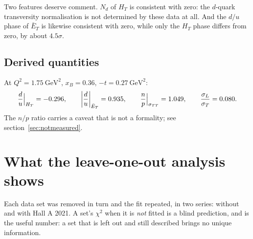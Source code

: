 \documentclass[11pt,a4paper]{article}
\newcommand{\sig}[1]{\sigma_{#1}}
\begin{document}
\begin{table}[htb]
\centering\small
\caption{Block parameters, eq.~(\ref{eq:gff}).  $N$ in nb$^{1/2}$/GeV,
$b$ and $b'$ in GeV$^{-2}$, $n_Q$ dimensionless.}
\label{tab:blocks}

\end{table}

\begin{table}[htb]
\centering\small
\caption{Remaining parameters, with the interval each was allowed.}
\label{tab:other}

\end{table}

Two features deserve comment.  $N_d$ of $H_T$ is consistent with zero: the
$d$-quark transversity normalisation is not determined by these data at all.
And the $d/u$ phase of $\bar E_T$ is likewise consistent with zero, while only
the $H_T$ phase differs from zero, by about $4.5\sigma$.

\subsection{Derived quantities}

At $Q^2 = 1.75\ \mathrm{GeV}^2$, $x_B = 0.36$, $-t = 0.27\ \mathrm{GeV}^2$:
\[
\frac{d}{u}\Big|_{H_T} = \rduHT, \qquad
\left|\frac{d}{u}\right|_{\bar E_T} = \rduET, \qquad
\frac{n}{p}\Big|_{\sig{TT}} = \rnoverp, \qquad
\frac{\sig{L}}{\sig{T}} = \rsigLoversigT .
\]
The $n/p$ ratio carries a caveat that is not a formality; see
section~\ref{sec:notmeasured}.

\section{What the leave-one-out analysis shows}

Each data set was removed in turn and the fit repeated, in two series: without
and with Hall A 2021.  A set's $\chi^2$ when it is \emph{not} fitted is a blind
prediction, and is the useful number: a set that is left out and still
described brings no unique information.
\end{document}
